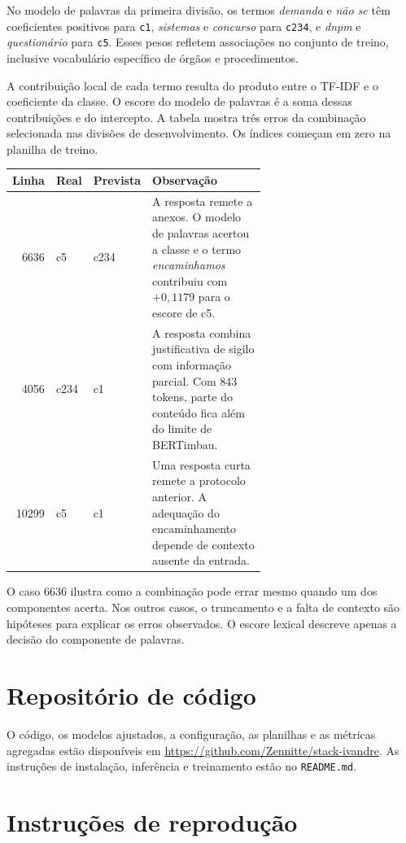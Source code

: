 \documentclass[11pt,a4paper]{article}
\begin{document}
No modelo de palavras da primeira divisão, os termos \emph{demanda} e \emph{não se} têm coeficientes positivos para \nolinkurl{c1}, \emph{sistemas} e \emph{concurso} para \nolinkurl{c234}, e \emph{dnpm} e \emph{questionário} para \nolinkurl{c5}. Esses pesos refletem associações no conjunto de treino, inclusive vocabulário específico de órgãos e procedimentos.

A contribuição local de cada termo resulta do produto entre o TF-IDF e o coeficiente da classe. O escore do modelo de palavras é a soma dessas contribuições e do intercepto. A tabela mostra três erros da combinação selecionada nas divisões de desenvolvimento. Os índices começam em zero na planilha de treino.

\begingroup\small
\begin{longtable}{@{}rl lp{0.62\linewidth}@{}}
\toprule
\textbf{Linha} & \textbf{Real} & \textbf{Prevista} & \textbf{Observação}\\
\midrule
6636 & c5 & c234 & A resposta remete a anexos. O modelo de palavras acertou a classe e o termo \emph{encaminhamos} contribuiu com $+0{,}1179$ para o escore de c5.\\
4056 & c234 & c1 & A resposta combina justificativa de sigilo com informação parcial. Com 843 tokens, parte do conteúdo fica além do limite de BERTimbau.\\
10299 & c5 & c1 & Uma resposta curta remete a protocolo anterior. A adequação do encaminhamento depende de contexto ausente da entrada.\\
\bottomrule
\end{longtable}
\endgroup

O caso 6636 ilustra como a combinação pode errar mesmo quando um dos componentes acerta. Nos outros casos, o truncamento e a falta de contexto são hipóteses para explicar os erros observados. O escore lexical descreve apenas a decisão do componente de palavras.

\section{Repositório de código}

O código, os modelos ajustados, a configuração, as planilhas e as métricas agregadas estão disponíveis em \url{https://github.com/Zennitte/stack-ivandre}. As instruções de instalação, inferência e treinamento estão no \nolinkurl{README.md}.

\section{Instruções de reprodução}
\end{document}
